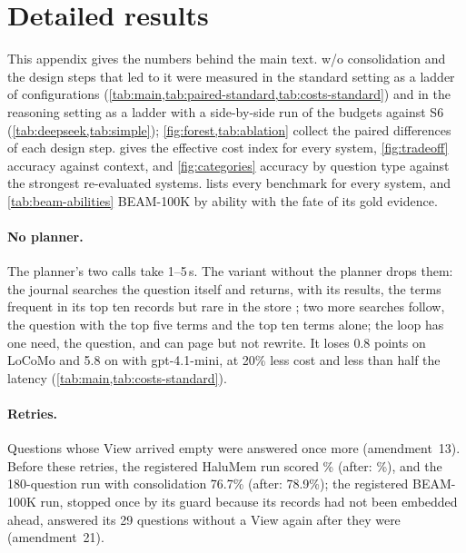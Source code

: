 \renewenvironment{gentable}{\begin{table}[H]}{\end{table}}

\section{Detailed results}
\label{app:details}

This appendix gives the numbers behind the main text.
\sys{} w/o consolidation and the design steps that led to it were measured in the standard setting as a ladder of configurations (\cref{tab:main,tab:paired-standard,tab:costs-standard}) and in the reasoning setting as a ladder with a side-by-side run of the budgets against S6 (\cref{tab:deepseek,tab:simple}); \cref{fig:forest,tab:ablation} collect the paired differences of each design step.
 gives the effective cost index for every system, \cref{fig:tradeoff} accuracy against context, and \cref{fig:categories} accuracy by question type against the strongest re-evaluated systems.
 lists every benchmark for every system, and \cref{tab:beam-abilities} BEAM-100K by ability with the fate of its gold evidence.

\paragraph{No planner.}
The planner's two calls take 1--5\,s.
The variant without the planner drops them: the journal searches the question itself and returns, with its results, the terms frequent in its top ten records but rare in the store \citep{rocchio1971relevance,lavrenko2001relevance}; two more searches follow, the question with the top five terms and the top ten terms alone; the loop has one need, the question, and can page but not rewrite.
It loses 0.8 points on LoCoMo and 5.8 on \lme{} with gpt-4.1-mini, at 20\% less cost and less than half the latency (\cref{tab:main,tab:costs-standard}).

\paragraph{Retries.}
Questions whose View arrived empty were answered once more (amendment~13).
Before these retries, the registered HaluMem run scored \haluCorrectBefore\% (after: \haluCorrect\%), and the 180-question \lme{} run with consolidation 76.7\% (after: 78.9\%); the registered BEAM-100K run, stopped once by its guard because its records had not been embedded ahead, answered its 29 questions without a View again after they were (amendment~21).

